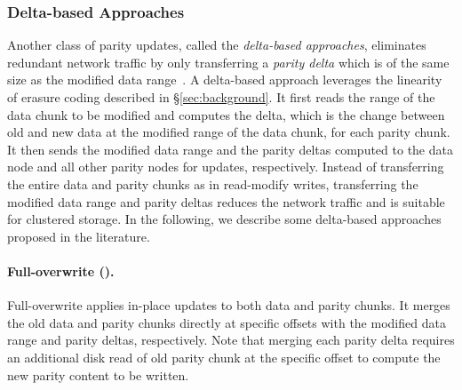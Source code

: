 \subsubsection{Delta-based Approaches}
\label{sec:delta_based}

Another class of parity updates, called the {\em delta-based approaches}, 
eliminates redundant network traffic by only transferring a {\em parity delta}
which is of the same size as the modified data range~\cite{cao94,storer08}.  A
delta-based approach
leverages the linearity of erasure coding described in
\S\ref{sec:background}. It first reads the range of the data chunk to be
modified and computes the delta, which is the change between old and new data at the modified 
range of the data chunk, for each parity chunk. It then sends the
modified data range and the parity deltas computed to the data node and all
other parity nodes for updates, respectively. 
Instead of transferring the entire data and parity chunks as in
read-modify writes, transferring the modified data range and parity deltas
reduces the
network traffic and is suitable for clustered storage.  In the following, we
describe some delta-based approaches proposed in the literature. 



\paragraph{Full-overwrite (\FO).} Full-overwrite
\cite{aguilera05} applies in-place updates
to both data and parity chunks. It merges the old data and parity chunks
directly at specific offsets with the modified data range and parity deltas,
respectively. Note that merging each parity delta requires an additional disk read of
old parity chunk at the specific offset to compute the new parity content to be
written.

